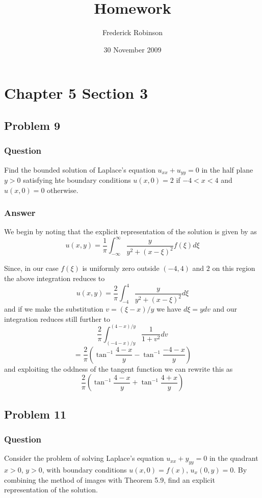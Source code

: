 \documentclass[12pt]{article}
\title{Homework}
\author{Frederick Robinson}
\date{30 November 2009}
\begin{document}

   \maketitle

\setcounter{tocdepth}{2} 

\tableofcontents

\section{Chapter 5 Section 3}

\subsection{Problem 9}
\subsubsection{Question}
Find the bounded solution of Laplace's equation $u_{xx}+u_{yy}=0$ in the half plane $y>0$ satisfying hte boundary conditions $u(x,0)=2$ if  $-4<x<4$ and $u(x,0)=0$ otherwise.

\subsubsection{Answer}
We begin by noting that the explicit representation of the solution is given by \cite[Page 333 5.3.19]{pinsky} as
\[u(x,y)=\frac{1}{\pi}\int_{-\infty}^\infty \frac{y}{y^2+(x-\xi)^2} f(\xi) d\xi\]

Since, in our case $f(\xi)$ is uniformly zero outside $(-4,4)$ and $2$ on this region the above integration reduces to
\[u(x,y)=\frac{2}{\pi}\int_{-4}^4 \frac{y}{y^2+(x-\xi)^2} d\xi\]
and if we make the substitution $v=(\xi-x)/y$ we have $d\xi=y dv$ and our integration reduces still further to
\[\frac{2}{\pi} \int_{(-4-x)/y}^{(4-x)/y} \frac{1}{1+v^2} dv\]
\[=\frac{2}{\pi} \left( \tan^{-1}{\frac{4-x}{y}} - \tan^{-1}{\frac{-4-x}{y}} \right)\]
and exploiting the oddness of the tangent function we can rewrite this as 
\[\frac{2}{\pi} \left( \tan^{-1}{\frac{4-x}{y}} + \tan^{-1}{\frac{4+x}{y}} \right)\]



\subsection{Problem 11}

\subsubsection{Question}
Consider the problem of solving Laplace's equation $u_{xx}+y_{yy}=0$ in the quadrant $x>0$, $y>0$, with boundary conditions $u(x,0) = f(x)$, $u_x (0,y)=0$. By combining the method of images with Theorem 5.9, find an explicit representation of the solution.
\end{document}
